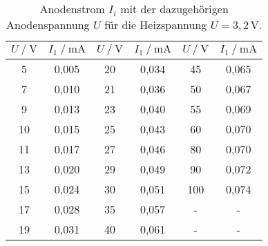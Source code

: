 %

\begin{table}[H]
    \centering
    \caption{Anodenstrom $I_i$ mit der dazugehörigen Anodenspannung $U$ für die Heizspannung $U = 3,2 \, \unit{\volt} $.}
    \label{tab:kennlini1_1}
    \begin{tabular}{S S S S S[table-format=3.0] S}
      \toprule
      {$U \mathbin{/} \unit{\volt}$} & {$I_1 \mathbin{/} \unit{\milli\ampere}$} & {$U \mathbin{/} \unit{\volt}$} & {$I_1 \mathbin{/} \unit{\milli\ampere}$} & {$U \mathbin{/} \unit{\volt}$} & {$I_1 \mathbin{/} \unit{\milli\ampere}$}  \\
      \midrule
        {5}&       {0,005} & {20}&      {0,034} & {45}&      {0,065}\\
        {7}&       {0,010} & {21}&      {0,036} & {50}&      {0,067}\\
        {9}&       {0,013} & {23}&      {0,040} & {55}&      {0,069}\\
        {10}&      {0,015} & {25}&      {0,043} & {60}&      {0,070}\\
        {11}&      {0,017} & {27}&      {0,046} & {80}&      {0,070}\\
        {13}&      {0,020} & {29}&      {0,049} & {90}&      {0,072}\\
        {15}&      {0,024} & {30}&      {0,051} & {100}&     {0,074}\\
        {17}&      {0,028} & {35}&      {0,057} & {-}   &    {-}    \\
        {19}&      {0,031} & {40}&      {0,061} & {-}   &    {-}    \\
      \bottomrule
    \end{tabular}
\end{table}

